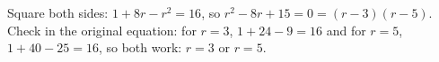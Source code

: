 Square both sides: $1+8r-r^2=16$, so $r^2-8r+15=0=(r-3)(r-5)$. Check in the original equation: for $r=3$, $1+24-9=16$ and for $r=5$, $1+40-25=16$, so both work: $\boxed{r=3\text{ or }r=5}$.
